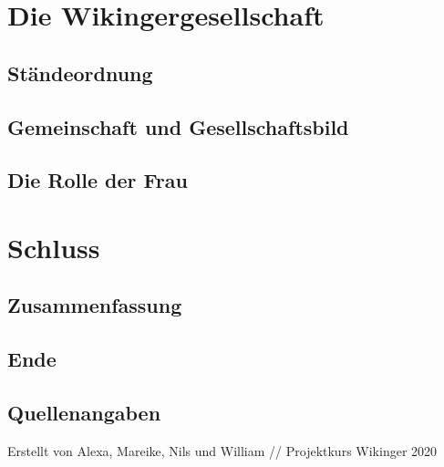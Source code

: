 \documentclass[12pt,a4paper,ngerman,openany]{book}
\newcommand\blankpage{\null \thispagestyle{empty} \addtocounter{page}{-1} \newpage}
\newcommand{\fchapter}[1]{\chapter{#1}\thispagestyle{chapterstyle}}
\begin{document}
\lipsum[3]

\fchapter{Die Wikingergesellschaft}

\section{Ständeordnung}

\lipsum[6]

\section{Gemeinschaft und Gesellschaftsbild}

\lipsum[6]

\section{Die Rolle der Frau}

\lipsum[6]

\fchapter{Schluss}

\section{Zusammenfassung}

\lipsum[6]

\section{Ende}

\lipsum[6]

\newpage %
\section{Quellenangaben}

\afterpage{\blankpage}
\afterpage{\blankpage}
\afterpage{\blankpage}
\afterpage{\blankpage}
\afterpage{\blankpage}

\newpage
\vspace*{24cm} Erstellt von Alexa, Mareike, Nils und William // Projektkurs Wikinger 2020
\thispagestyle{empty}
\newpage

\thispagestyle{empty}
\end{document}
